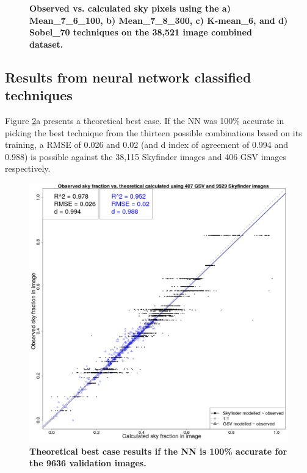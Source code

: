 \documentclass[final,3p,times,authoryear]{elsarticle}
\begin{document}
\begin{figure}
\caption{\textbf{Observed vs. calculated sky pixels using the a) Mean\_7\_6\_100, b) Mean\_7\_8\_300, c) K-mean\_6, and d) Sobel\_70 techniques on the 38,521 image combined dataset.} }
\label{fig:errorallcombined}
\end{figure}

\subsection{Results from neural network classified techniques}\label{sec:resultsnn}
Figure \ref{fig:errorplots}a presents a theoretical best case. If the NN was 100\% accurate in picking the best technique from the thirteen possible combinations based on its training, a RMSE of 0.026 and 0.02 (and d index of agreement of 0.994 and 0.988) is possible against the 38,115 Skyfinder images and 406 GSV images respectively. 

\begin{figure}
\centering
\includegraphics[scale=0.15]{Images/ErrorPlots1Combined.png}

\caption{\textbf{
Theoretical best case results if the NN is 100\% accurate for the 9636 validation images. 
}}
\label{fig:errorplotscntk} \label{fig:errorplots}
\end{figure}
\end{document}
